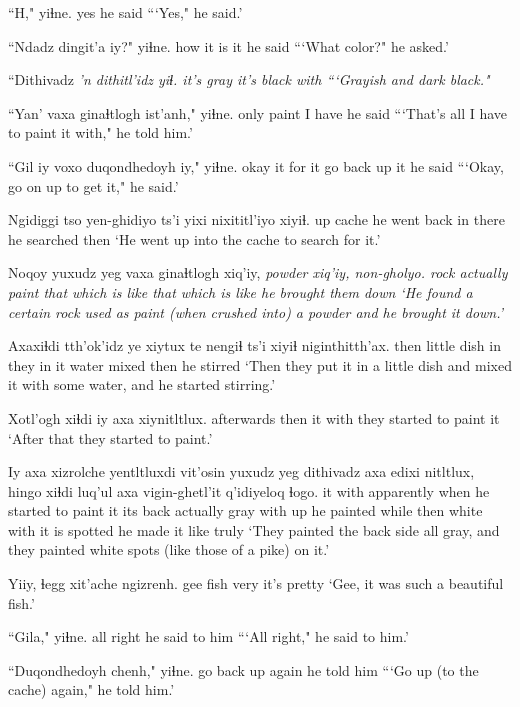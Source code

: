 \documentclass[12pt]{article}
\begin{document}
\gll ``H," yiɬne.
yes {he said}
\glt ```Yes," he said.'
\glend

\gll ``Ndadz dingit'a iy?" yiɬne. 
how {it is} it {he said}
\glt ```What color?" he asked.'
\glend

\gll ``Dithivadz \em{'n} dithitl'idz yiɬ. 
{it's gray} {} {it's black} with
\glt ```Grayish and dark black."
\glend

\gll ``Yan' {vaxa ginaɬtlogh} ist'anh," yiɬne.
only paint {I have} {he said}
\glt ```That's all I have to paint it with," he told him.'
\glend

\gll ``Gil iy voxo duqondhedoyh iy," yiɬne.
okay it {for it} {go back up} it {he said}
\glt ```Okay, go on up to get it," he said.'
\glend

\gll Ngidiggi tso yen-ghidiyo ts'i yixi nixititl'iyo xiyiɬ.
up cache {he went back in} {} there {he searched} then
\glt `He went up into the cache to search for it.' 
\glend

\gll Noqoy {yuxudz yeg} {vaxa ginaɬtlogh} xiq'iy, \em{powder} xiq'iy, non-gholyo. 
rock actually paint {that which is like} {} {that which is like} {he brought them down}
\glt `He found a certain rock used as paint (when crushed into) a powder and he brought it down.' 
\glend

\gll Axaxiɬdi tth'ok'idz ye xiytux te nengiɬ ts'i xiyiɬ niginthitth'ax. 
then {little dish} in {they in it} water {mixed} {} then {he stirred}
\glt `Then they put it in a little dish and mixed it with some water, and he started stirring.'
\glend

\gll Xotl'ogh xiɬdi iy axa xiynitltlux.
afterwards then it with {they started to paint it} 
\glt `After that they started to paint.'
\glend

\gll  Iy axa xizrolche yentltluxdi vit'osin {yuxudz yeg} dithivadz axa edixi nitltlux, hingo xiɬdi luq'ul axa vigin-ghetl'it q'idiyeloq ɬogo.
it with apparently {when he started to paint it} {its back} actually gray with up {he painted} while then white with {it is spotted} {he made it like} truly
\glt `They painted the back side all gray, and they painted white spots (like those of a pike) on it.'
\glend

\gll Yiiy, ɬegg xit'ache ngizrenh.
gee fish very {it's pretty}
\glt `Gee, it was such a beautiful fish.'
\glend

\gll ``Gila," yiɬne.
{all right} {he said to him}
\glt ```All right," he said to him.'
\glend

\gll ``Duqondhedoyh chenh," yiɬne.
{go back up} again {he told him}
\glt ```Go up (to the cache) again," he told him.'
\glend
\end{document}
